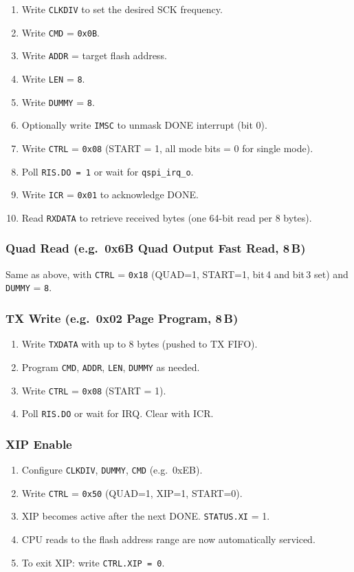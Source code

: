 \begin{enumerate}
  \item Write \texttt{CLKDIV} to set the desired SCK frequency.
  \item Write \texttt{CMD} = \texttt{0x0B}.
  \item Write \texttt{ADDR} = target flash address.
  \item Write \texttt{LEN} = \texttt{8}.
  \item Write \texttt{DUMMY} = \texttt{8}.
  \item Optionally write \texttt{IMSC} to unmask DONE interrupt (bit 0).
  \item Write \texttt{CTRL} = \texttt{0x08} (START = 1, all mode bits = 0 for single mode).
  \item Poll \texttt{RIS.DO = 1} or wait for \texttt{qspi\_irq\_o}.
  \item Write \texttt{ICR} = \texttt{0x01} to acknowledge DONE.
  \item Read \texttt{RXDATA} to retrieve received bytes (one 64-bit read per 8 bytes).
\end{enumerate}

\subsubsection{Quad Read (e.g.\ 0x6B Quad Output Fast Read, 8\,B)}

Same as above, with \texttt{CTRL} = \texttt{0x18} (QUAD=1, START=1, bit\,4 and bit\,3 set)
and \texttt{DUMMY} = \texttt{8}.

\subsubsection{TX Write (e.g.\ 0x02 Page Program, 8\,B)}

\begin{enumerate}
  \item Write \texttt{TXDATA} with up to 8 bytes (pushed to TX FIFO).
  \item Program \texttt{CMD}, \texttt{ADDR}, \texttt{LEN}, \texttt{DUMMY} as needed.
  \item Write \texttt{CTRL} = \texttt{0x08} (START = 1).
  \item Poll \texttt{RIS.DO} or wait for IRQ. Clear with ICR.
\end{enumerate}

\subsubsection{XIP Enable}

\begin{enumerate}
  \item Configure \texttt{CLKDIV}, \texttt{DUMMY}, \texttt{CMD} (e.g.\ 0xEB).
  \item Write \texttt{CTRL} = \texttt{0x50} (QUAD=1, XIP=1, START=0).
  \item XIP becomes active after the next DONE. \texttt{STATUS.XI} = 1.
  \item CPU reads to the flash address range are now automatically serviced.
  \item To exit XIP: write \texttt{CTRL.XIP = 0}.
\end{enumerate}

